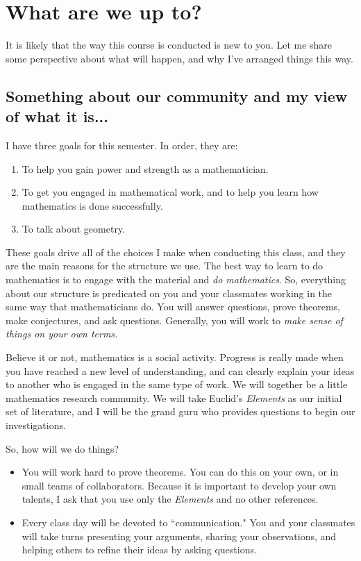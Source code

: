 \documentclass{tufte-handout}
\theoremstyle{definition}
\begin{document}

\section*{What are we up to?}

It is likely that the way this course is conducted is new to you. Let me share some perspective about what will happen, and why I've arranged things this way.

\subsection*{Something about our community and my view of what it is...}
I have three goals for this semester. In order, they are:
\begin{enumerate}
\item To help you gain power and strength as a mathematician.

\item To get you engaged in mathematical work, and to help you learn how mathematics is done successfully.

\item To talk about geometry.
\end{enumerate}

These goals drive all of the choices I make when conducting this class, and they are the main reasons for the structure we use. The best way to learn to do mathematics is to engage with the material and \emph{do mathematics}. So, everything about our structure is predicated on you and your classmates working in the same way that mathematicians do. You will answer questions, prove theorems, make conjectures, and ask questions. Generally, you will work to \emph{make sense of things on your own terms.} 

Believe it or not, mathematics is a social activity. Progress is really made when you have reached a new level of understanding, and can clearly explain your ideas to another who is engaged in the same type of work. We will together be a little mathematics research community. We will take Euclid's \emph{Elements} as our initial set of literature, and I will be the grand guru who provides questions to begin our investigations.

So, how will we do things?
\begin{itemize}
\item You will work hard to prove theorems. You can do this on your own, or in small teams of collaborators. Because it is important to develop your own talents, I ask that you use only the \emph{Elements} and no other references.

\item Every class day will be devoted to ``communication." You and your classmates will take turns presenting your arguments, sharing your observations, and helping others to refine their ideas by asking questions.
\end{itemize}
\end{document}
